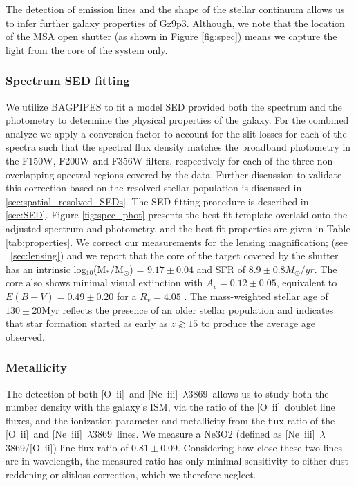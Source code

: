 \documentclass[sn-mathphys]{sn-jnl}%
\theoremstyle{thmstyleone}%
\theoremstyle{thmstyletwo}%
\theoremstyle{thmstylethree}%
\newcommand{\Oii}{[O~{\sc ii}]}
\newcommand{\Neiiia}{[Ne~{\sc iii}]~$\lambda$3869}
\begin{document}
The detection of emission lines and the shape of the stellar continuum allows us to infer further galaxy properties of Gz9p3. Although, we note that the location of the MSA open shutter (as shown in Figure \ref{fig:spec}) means we capture the light from the core of the system only.

\subsubsection{Spectrum SED fitting}\label{sec:spec_SED}

We utilize BAGPIPES \citep{Carnall18} to fit a model SED provided both the spectrum and the photometry to determine the physical properties of the galaxy. For the combined analyze we apply a conversion factor to account for the slit-losses for each of the spectra such that the spectral flux density matches the broadband photometry in the F150W, F200W and F356W filters, respectively for each of the three non overlapping spectral regions covered by the data. Further discussion to validate  this correction based on the resolved stellar population is discussed in  \ref{sec:spatial_resolved_SEDs}. The SED fitting procedure is described in \ref{sec:SED}. Figure \ref{fig:spec_phot} presents the best fit template overlaid onto the adjusted spectrum and photometry, and the best-fit properties are given in Table \ref{tab:properties}.  We correct our measurements for the lensing magnification; (see ~\ref{sec:lensing}) and we report that the core of the target covered by the shutter has an intrinsic log$_{10}$(M$_*/$M$_\odot$) = $9.17\pm0.04$ and SFR of $8.9\pm 0.8 M_\odot/yr$. The core also shows minimal visual extinction with 
$A_v = 0.12\pm0.05$, equivalent to $E(B-V)=0.49\pm0.20$ for a $R_v=4.05$ \citep{Calzetti00}.
The mass-weighted stellar age of $130\pm20$Myr reflects the presence of an older stellar population and indicates that star formation started as early as $z\gtrsim 15$ to produce the average age observed. 

\subsubsection{Metallicity}\label{sec:metallicity}

The detection of both \Oii\ and \Neiiia\ allows us to study both the number density with the galaxy's ISM, via the ratio of the \Oii\ doublet line fluxes, and the ionization parameter and metallicity from the flux ratio of the \Oii\ and \Neiiia\ lines. We measure a Ne3O2 (defined as \Neiiia/\Oii) line flux ratio of $0.81\pm0.09$. Considering how close these two lines are in wavelength, the measured ratio has only minimal sensitivity to either dust reddening or slitloss correction, which we therefore neglect. 
\end{document}
